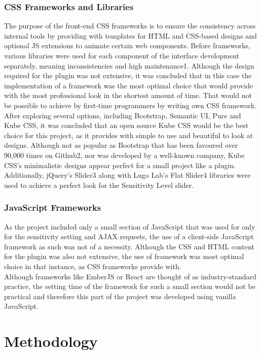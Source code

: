 \documentclass[a4paper,11pt]{article}
\begin{document}
\subsubsection{CSS Frameworks and Libraries}
The purpose of the front-end CSS frameworks is to ensure the consistency across internal tools by providing with templates for HTML and CSS-based designs and optional JS extensions to animate certain web components. Before frameworks, various libraries were used for each component of the interface development separately, meaning inconsistencies and high maintenance1. Although the design required for the plugin was not extensive, it was concluded that in this case the implementation of a framework was the most optimal choice that would provide with the most professional look in the shortest amount of time. That would not be possible to achieve by first-time programmers by writing own CSS framework. After exploring several options, including Bootstrap, Semantic UI, Pure and Kube CSS, it was concluded that an open source Kube CSS would be the best choice for this project, as it provides with simple to use and beautiful to look at designs. Although not as popular as Bootstrap that has been favoured over 90,000 times on Github2, nor was developed by a well-known company, Kube CSS’s minimalistic designs appear perfect for a small project like a plugin. 
\\
\indent Additionally, jQuery’s Slider3 along with Lugo Lab’s Flat Slider4 libraries were used to achieve a perfect look for the Sensitivity Level slider.

\subsubsection{JavaScript Frameworks}
As the project included only a small section of JavaScript that was used for only for the sensitivity setting and AJAX requests, the use of a client-side JavaScript framework as such was not of a necessity. Although the CSS and HTML content for the plugin was also not extensive, the use of framework was most optimal choice in that instance, as CSS frameworks provide with.
\\
\indent Although frameworks like EmberJS or React are thought of as industry-standard practice, the setting time of the framework for such a small section would not be practical and therefore this part of the project was developed using vanilla JavaScript.

\section {Methodology}
\end{document}

